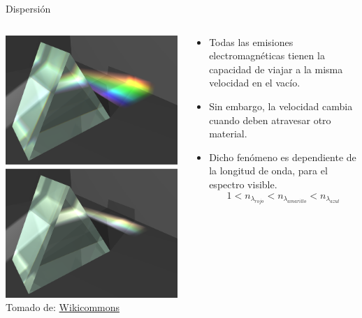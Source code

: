 \documentclass[aspectratio=169]{beamer}
\begin{document}
\begin{frame}{Dispersión}
    \begin{columns}[c, onlytextwidth]
    \begin{column}{0.45\textwidth}
            \centering
            \includegraphics[width = 0.7\linewidth]{fig/Optica/Prisms_with_high_and_low_dispersion.png}\\
            \tiny{Tomado de: \href{https://es.wikipedia.org/wiki/Dispersición_refractiva}{Wikicommons}}
        \end{column}
        \begin{column}{0.55\textwidth}
            \begin{itemize}
                \item Todas las emisiones electromagnéticas tienen la capacidad de viajar a la misma velocidad en el vacío.
                \item Sin embargo, la velocidad cambia cuando deben atravesar otro material.
                \item Dicho fenómeno es dependiente de la longitud de onda, para el espectro visible.
                \begin{equation*}
                    1 < n_{\lambda_{rojo}} < n_{\lambda_{amarillo}} < n_{\lambda_{azul}}
                \end{equation*}
            \end{itemize}
        \end{column}
    \end{columns}
\end{frame}
\end{document}
